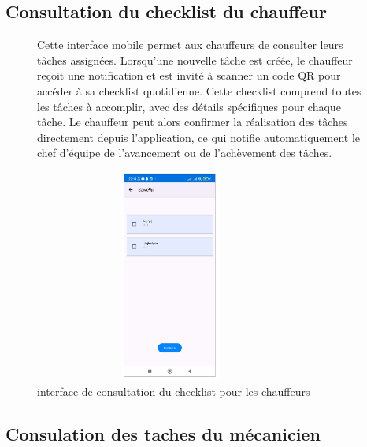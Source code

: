 \subsection{Consultation du checklist du chauffeur}

\begin{figure}[htbp]
  \centering
  \begin{minipage}{0.58\textwidth}
    \raggedright
    Cette interface mobile permet aux chauffeurs de consulter leurs tâches assignées. Lorsqu'une nouvelle tâche est créée, le chauffeur reçoit une notification et est invité à scanner un code QR pour accéder à sa checklist quotidienne. Cette checklist comprend toutes les tâches à accomplir, avec des détails spécifiques pour chaque tâche. Le chauffeur peut alors confirmer la réalisation des tâches directement depuis l'application, ce qui notifie automatiquement le chef d'équipe de l'avancement ou de l'achèvement des tâches.
  \end{minipage}
  \hfill
  \begin{minipage}{0.39\textwidth}
    \centering
    \includegraphics[width=0.8\textwidth,height=7cm]{chap4.images/consultation du checklist.png}
    \caption{interface de consultation du checklist pour les chauffeurs }
  \end{minipage}
\end{figure}


\subsection{Consulation des taches du mécanicien }

